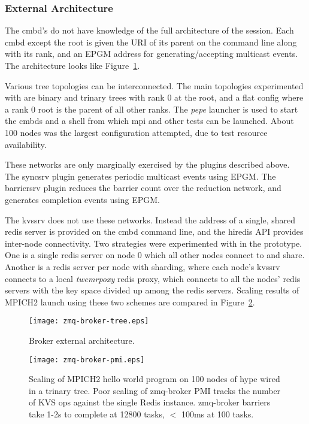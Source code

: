 \subsubsection {External Architecture}
The cmbd's do not have knowledge of the full architecture of the session.
Each cmbd except the root is given the URI of its parent on the command line
along with its rank, and an EPGM address for generating/accepting multicast
events.  The architecture looks like Figure~\ref{fig:cmbext}.

Various tree topologies can be interconnected.
The main topologies experimented with are binary and trinary trees with
rank 0 at the root, and a flat config where a rank 0 root is the parent
of all other ranks.  
The {\em pepe} launcher is used to start the cmbds and a shell from which
mpi and other tests can be launched.
About 100 nodes was the largest configuration attempted,
due to test resource availability.

These networks are only marginally exercised by the plugins described above.
The syncsrv plugin generates periodic multicast events using EPGM.
The barriersrv plugin reduces the barrier count over the reduction network,
and generates completion events using EPGM.

The kvssrv does not use these networks.  Instead the address of a single,
shared redis server is provided on the cmbd command line, and the hiredis
API provides inter-node connectivity.  Two strategies were experimented
with in the prototype.  One is a single redis server on node 0 which
all other nodes connect to and share.  Another is a redis server per node
with sharding, where each node's kvssrv connects to a local {\em twemrpoxy}
redis proxy, which connects to all the nodes' redis servers with the key
space divided up among the redis servers.  Scaling results of MPICH2
launch using these two schemes are compared in Figure~\ref{fig:cmbscale}.

\begin{figure}
\centering
\texttt{[image: zmq-broker-tree.eps]}
\caption{Broker external architecture.}
\label{fig:cmbext}
\end{figure}

\begin{figure}
\centering
\texttt{[image: zmq-broker-pmi.eps]}
\caption{Scaling of MPICH2 hello world program on 100 nodes of hype wired
in a trinary tree.  Poor scaling of zmq-broker PMI tracks the number of
KVS ops against the single Redis instance.  zmq-broker barriers take 1-2s
to complete at 12800 tasks, $<$ 100ms at 100 tasks.}
\label{fig:cmbscale}
\end{figure}


